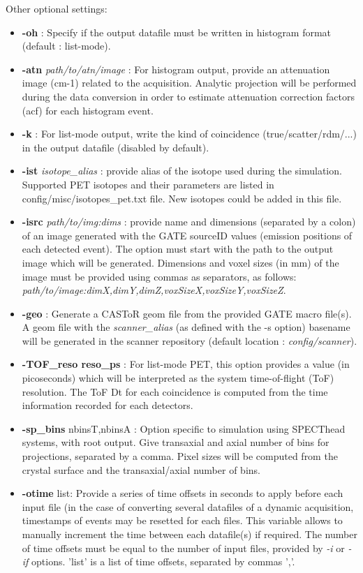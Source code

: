 \documentclass[a4paper, 11pt]{article}
\begin{document}
Other optional settings:
\begin{itemize}
  \item \textbf{-oh} : Specify if the output datafile must be written in histogram format (default : list-mode).
  \item \textbf{-atn} \textit{path/to/atn/image} : For histogram output, provide an attenuation image (cm-1) related to the acquisition.
        Analytic projection will be performed during the data conversion in order to estimate attenuation correction factors (acf) for
        each histogram event.       
  \item \textbf{-k} : For list-mode output, write the kind of coincidence (true/scatter/rdm/...) in the output datafile (disabled by default).
  \item \textbf{-ist} \textit{isotope\_alias}           : provide alias of the isotope used during the simulation. Supported PET isotopes
        and their parameters are listed in config/misc/isotopes\_pet.txt file. New isotopes could be added in this file.
  \item \textbf{-isrc} \textit{path/to/img:dims}       : provide name and dimensions (separated by a colon) of an image generated with
        the GATE sourceID values (emission positions of each detected event). The option must start with the path to the output image
        which will be generated. Dimensions and voxel sizes (in mm) of the image must be provided using commas as separators, as follows:
        \textit{path/to/image:dimX,dimY,dimZ,voxSizeX,voxSizeY,voxSizeZ}.
  \item \textbf{-geo}                       : Generate a CASToR geom file from the provided GATE macro file(s). A geom file with the
        \textit{scanner\_alias} (as defined with the -s option) basename will be generated in the scanner repository (default location : \textit{config/scanner}).
  \item \textbf{-TOF\_reso reso\_ps} : For list-mode PET, this option provides a value (in picoseconds) which will be interpreted as the system time-of-flight (ToF) resolution. The ToF Dt for each coincidence is computed from the time information recorded for each detectors.
  \item \textbf{-sp\_bins} nbinsT,nbinsA                      : Option specific to simulation using SPECThead systems, with root output. Give transaxial and axial number of bins for projections, separated by a comma. Pixel sizes will be computed from the crystal surface and the transaxial/axial number of bins.                   
  \item \textbf{-otime} list: Provide a series of time offsets in seconds to apply before each input file (in the case of converting several
        datafiles of a dynamic acquisition, timestamps of events may be resetted for each files. This variable allows to manually increment
        the time between each datafile(s) if required. The number of time offsets must be equal to the number of input files, provided by
        \textit{-i} or \textit{-if} options. 'list' is a list of time offsets, separated by commas ','.
\end{itemize}
\end{document}
